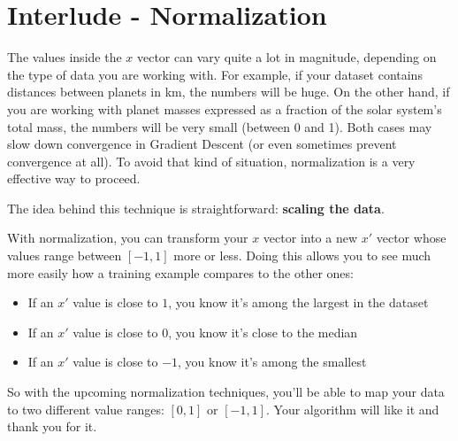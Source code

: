 
\section*{Interlude - Normalization}

The values inside the $x$ vector can vary quite a lot in magnitude,
depending on the type of data you are working with.
For example, if your dataset contains distances between planets in km, the numbers will be huge.
On the other hand, if you are working with planet masses expressed as a fraction of the solar system's total mass, the numbers will be very small (between 0 and 1).
Both cases may slow down convergence in Gradient Descent (or even sometimes prevent convergence at all).
To avoid that kind of situation, normalization is a very effective way to proceed.


The idea behind this technique is straightforward: \textbf{scaling the data}.  


With normalization, you can transform your $x$ vector into a new $x'$ vector whose values range between $[-1, 1]$ more or less. Doing this allows you to see much more easily how a training example compares to the other ones:
\begin{itemize}
    \item If an $x'$ value is close to $1$, you know it's among the largest in the dataset
    \item If an $x'$ value is close to $0$, you know it's close to the median
    \item If an $x'$ value is close to $-1$, you know it's among the smallest
\end{itemize}

So with the upcoming normalization techniques, you'll be able to map your data to two different value ranges: $[0, 1]$ or $[-1, 1]$. Your algorithm will like it and thank you for it.  
